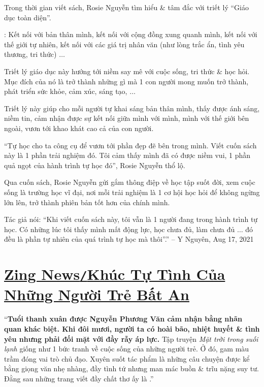\documentclass[oneside]{book}
\numberwithin{equation}{section}
\begin{document}
Trong thời gian viết sách, Rosie Nguyễn tìm hiểu \& tâm đắc với triết lý ``Giáo dục toàn diện''.

: Kết nối với bản thân mình, kết nối với cộng đồng xung quanh mình, kết nối với thế giới tự nhiên, kết nối với các giá trị nhân văn (như lòng trắc ẩn, tình yêu thương, tri thức) $\ldots$

Triết lý giáo dục này hướng tới niềm say mê với cuộc sống, tri thức \& học hỏi. Mục đích của nó là trở thành những gì mà 1 con người mong muốn trở thành, phát triển sức khỏe, cảm xúc, sáng tạo, $\ldots$

Triết lý này giúp cho mỗi người tự khai sáng bản thân mình, thấy được ánh sáng, niềm tin, cảm nhận được sự kết nối giữa mình với mình, mình với thế giới bên ngoài, vươn tới khao khát cao cả của con người.

``Tự học cho ta công cụ để vươn tới phần đẹp đẽ bên trong mình. Viết cuốn sách này là 1 phần trải nghiệm đó. Tôi cảm thấy mình đã có được niềm vui, 1 phần quả ngọt của hành trình tự học đó'', Rosie Nguyễn thổ lộ.

Qua cuốn sách, Rosie Nguyễn gửi gắm thông điệp về học tập suốt đời, xem cuộc sống là trường học vĩ đại, nơi mỗi trải nghiệm là 1 cơ hội học hỏi để không ngừng lớn lên, trở thành phiên bản tốt hơn của chính mình.

Tác giả nói: ``Khi viết cuốn sách này, tôi vẫn là 1 người đang trong hành trình tự học. Có những lúc tôi thấy mình mất động lực, học chưa đủ, làm chưa đủ $\ldots$ đó đều là phần tự nhiên của quá trình tự học mà thôi''.'' -- Y Nguyên, Aug 17, 2021


\section{\href{https://zingnews.vn/khuc-tu-tinh-cua-nhung-nguoi-tre-bat-an-post1322529.html}{Zing News\texttt{/}Khúc Tự Tình Của Những Người Trẻ Bất An}}
``\textbf{Tuổi thanh xuân được Nguyễn Phương Văn cảm nhận bằng nhãn quan khác biệt. Khi đôi mươi, người ta có hoài bão, nhiệt huyết \& tình yêu nhưng phải đối mặt với đầy rẫy áp lực.} Tập truyện \textit{Mặt trời trong suối lạnh} giống như 1 bức tranh về cuộc sống của những người trẻ. Ở đó, gam màu trầm đóng vai trò chủ đạo. Xuyên suốt tác phẩm là những câu chuyện được kể bằng giọng văn nhẹ nhàng, đầy tình tứ nhưng man mác buồn \& trĩu nặng suy tư. Đằng sau những trang viết đầy chất thơ ấy là .''
\end{document}
